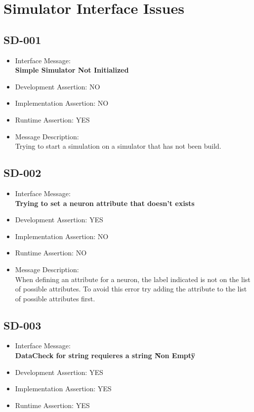 \section{Simulator Interface Issues}

\subsection{SD-001}
\begin{itemize}
  \item Interface Message:\\[1em]
    \textbf{Simple Simulator Not Initialized}
  \item Development Assertion: NO
  \item Implementation Assertion: NO
  \item Runtime Assertion: YES
  \item Message Description:\\[1em]
    Trying to start a simulation on a simulator that has not been build.
\end{itemize}

\subsection{SD-002}
\begin{itemize}
  \item Interface Message:\\[1em]
    \textbf{Trying to set a neuron attribute that doesn't exists}
  \item Development Assertion: YES
  \item Implementation Assertion: NO
  \item Runtime Assertion: NO
  \item Message Description:\\[1em]
    When defining an attribute for a neuron, the label indicated is not on the list of possible attributes. To avoid this error try adding the attribute to the list of possible attributes first.
\end{itemize}

\subsection{SD-003}
\begin{itemize}
  \item Interface Message:\\[1em]
    \textbf{DataCheck for string requieres a string \"Non Empty\"}
  \item Development Assertion: YES
  \item Implementation Assertion: YES
  \item Runtime Assertion: YES
\end{itemize}

